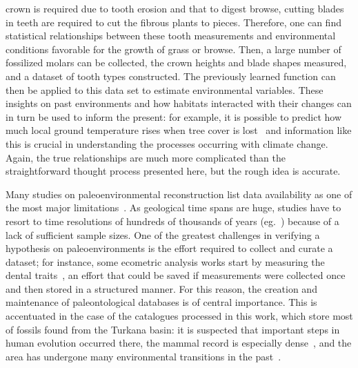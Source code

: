 \documentclass[english,twoside,openright]{UH_DS_MSc}
\begin{document}
crown is required due to tooth erosion and that to digest browse, cutting blades in teeth are required to cut the fibrous plants to pieces.
Therefore, one can find statistical relationships between these tooth measurements and environmental conditions favorable 
for the growth of grass or browse. Then, a large number of fossilized molars can be collected, the crown heights and blade shapes measured, and a dataset of 
tooth types constructed. The previously learned function can then be applied to this data set
 to estimate environmental variables. These insights on 
 past environments and how habitats interacted with their changes can 
 in turn be used to inform the present: for example, it is possible to predict how much local ground temperature rises when tree cover is lost~\cite{fortelius} and
information like this is crucial in understanding the processes occurring with climate
change.
  Again, the true relationships are much more complicated 
 than the straightforward thought process presented here, but the rough idea is accurate.




Many studies on paleoenvironmental reconstruction list data availability as one of the most major limitations~\cite{oksanenHumboldtianApproachLife2019,fortelius}.
As geological time spans are huge, studies have to 
resort to time resolutions of hundreds of thousands of years (eg.~\cite{fortelius}) because of a lack 
of sufficient sample sizes. One of the greatest challenges in verifying a hypothesis on 
paleoenvironments is the effort required to collect and curate a dataset; for instance, some ecometric
analysis works start by measuring the dental traits~\cite{fortelius}, an effort that could be saved 
if measurements were collected once and then stored in a structured manner. For this reason, the 
creation and maintenance of paleontological databases is of central importance. This is accentuated 
in the case of the catalogues processed in this work, which store most of fossils found from the Turkana basin: it is suspected that
important steps in human evolution occurred there, the mammal record is especially dense~\cite{fortelius}, and the area has undergone many environmental transitions in the past~\cite{Zliobaite2023}.
\end{document}
